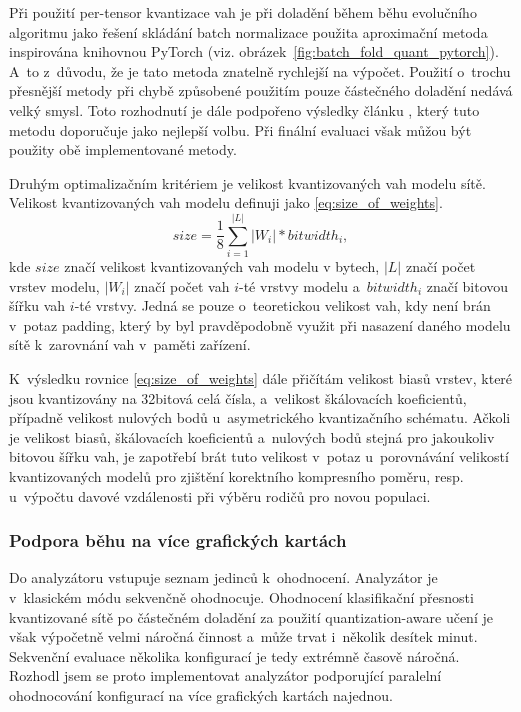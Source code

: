 Při použití per-tensor kvantizace vah je při doladění během běhu evolučního algoritmu jako řešení skládání batch normalizace použita aproximační metoda inspirována knihovnou PyTorch (viz. obrázek~\ref{fig:batch_fold_quant_pytorch}). A~to z~důvodu, že je tato metoda znatelně rychlejší na výpočet. Použití o~trochu přesnější metody při chybě způsobené použitím pouze částečného doladění nedává velký smysl. Toto rozhodnutí je dále podpořeno výsledky článku \cite{li2022mqbench}, který tuto metodu doporučuje jako nejlepší volbu. Při finální evaluaci však můžou být použity obě implementované metody.

Druhým optimalizačním kritériem je velikost kvantizovaných vah modelu sítě. Velikost kvantizovaných vah modelu definuji jako \eqref{eq:size_of_weights}.
\begin{equation}
    \label{eq:size_of_weights}
    size = \frac{1}{8}\sum_{i = 1}^{|L|} |W_i| * bitwidth_i,
\end{equation}
kde $size$ značí velikost kvantizovaných vah modelu v bytech, $|L|$ značí počet vrstev modelu, $|W_i|$ značí počet vah $i$-té vrstvy modelu a~$bitwidth_i$ značí bitovou šířku vah $i$-té vrstvy. Jedná se pouze o~teoretickou velikost vah, kdy není brán v~potaz padding, který by byl pravděpodobně využit při nasazení daného modelu sítě k~zarovnání vah v~paměti zařízení.

K~výsledku rovnice \eqref{eq:size_of_weights} dále přičítám velikost biasů vrstev, které jsou kvantizovány na 32bitová celá čísla, a~velikost škálovacích koeficientů, případně velikost nulových bodů u~asymetrického kvantizačního schématu. Ačkoli je velikost biasů, škálovacích koeficientů a~nulových bodů stejná pro jakoukoliv bitovou šířku vah, je zapotřebí brát tuto velikost v~potaz u~porovnávání velikostí kvantizovaných modelů pro zjištění korektního kompresního poměru, resp. u~výpočtu davové vzdálenosti při výběru rodičů pro novou populaci.

\subsubsection{Podpora běhu na více grafických kartách}

Do analyzátoru vstupuje seznam jedinců k~ohodnocení. Analyzátor je v~klasickém módu sekvenčně ohodnocuje. Ohodnocení klasifikační přesnosti kvantizované sítě po částečném doladění za použití quantization-aware učení je však výpočetně velmi náročná činnost a~může trvat i~několik desítek minut. Sekvenční evaluace několika konfigurací je tedy extrémně časově náročná. Rozhodl jsem se proto implementovat analyzátor podporující paralelní ohodnocování konfigurací na více grafických kartách najednou.

